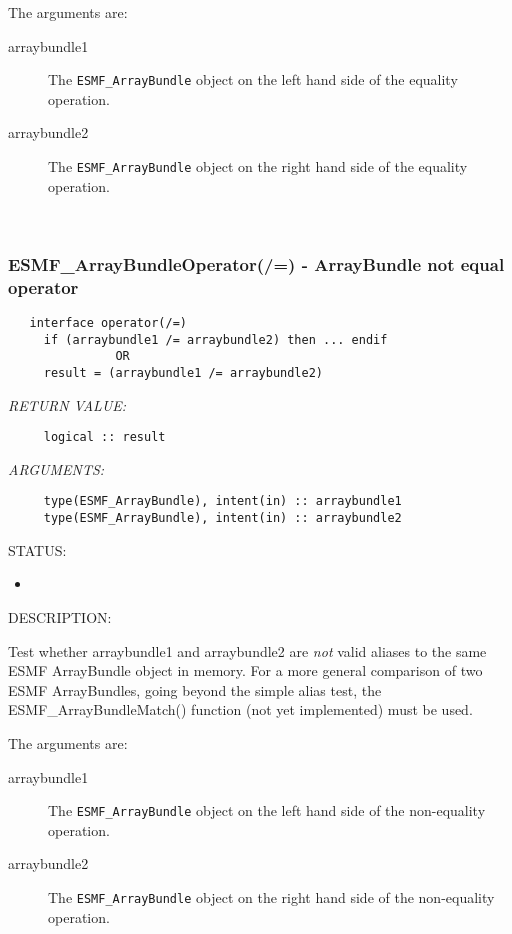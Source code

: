      The arguments are:
     \begin{description}
     \item[arraybundle1]
       The {\tt ESMF\_ArrayBundle} object on the left hand side of the equality
       operation.
     \item[arraybundle2]
       The {\tt ESMF\_ArrayBundle} object on the right hand side of the equality
       operation.
     \end{description}
   
 
\mbox{}\hrulefill\ 
 
\subsubsection [ESMF\_ArrayBundleOperator(/=)] {ESMF\_ArrayBundleOperator(/=) - ArrayBundle not equal operator}


  
\begin{verbatim}   interface operator(/=)
     if (arraybundle1 /= arraybundle2) then ... endif
               OR
     result = (arraybundle1 /= arraybundle2)\end{verbatim}{\em RETURN VALUE:}
\begin{verbatim}     logical :: result\end{verbatim}{\em ARGUMENTS:}
\begin{verbatim}     type(ESMF_ArrayBundle), intent(in) :: arraybundle1
     type(ESMF_ArrayBundle), intent(in) :: arraybundle2\end{verbatim}
{\sf STATUS:}
   \begin{itemize}
   \item{}
   \end{itemize}
  
{\sf DESCRIPTION:\\ }


     \begin{sloppypar}
     Test whether arraybundle1 and arraybundle2 are {\it not} valid aliases to the
     same ESMF ArrayBundle object in memory. For a more general comparison of two ESMF
     ArrayBundles, going beyond the simple alias test, the ESMF\_ArrayBundleMatch() function
     (not yet implemented) must be used.
     \end{sloppypar}
  
     The arguments are:
     \begin{description}
     \item[arraybundle1]
       The {\tt ESMF\_ArrayBundle} object on the left hand side of the non-equality
       operation.
     \item[arraybundle2]
       The {\tt ESMF\_ArrayBundle} object on the right hand side of the non-equality
       operation.
     \end{description}
   
